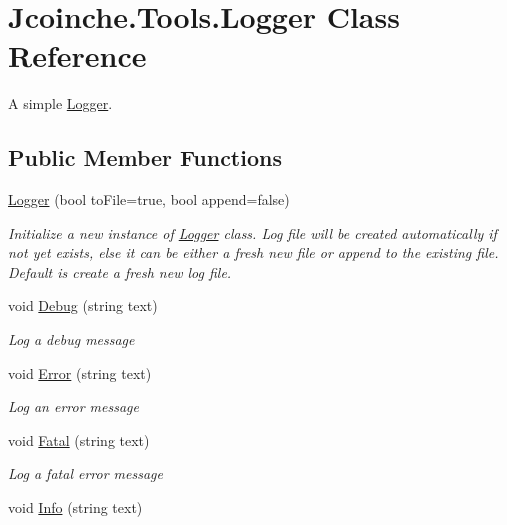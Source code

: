 \hypertarget{class_jcoinche_1_1_tools_1_1_logger}{}\section{Jcoinche.\+Tools.\+Logger Class Reference}
\label{class_jcoinche_1_1_tools_1_1_logger}


A simple \hyperlink{class_jcoinche_1_1_tools_1_1_logger}{Logger}.  


\subsection*{Public Member Functions}
\begin{DoxyCompactItemize}
\item 
\hyperlink{class_jcoinche_1_1_tools_1_1_logger_aaa424db2ffd03c2d6c3239d54b15d205}{Logger} (bool to\+File=true, bool append=false)
\begin{DoxyCompactList}\small\item\em Initialize a new instance of \hyperlink{class_jcoinche_1_1_tools_1_1_logger}{Logger} class. Log file will be created automatically if not yet exists, else it can be either a fresh new file or append to the existing file. Default is create a fresh new log file. \end{DoxyCompactList}\item 
void \hyperlink{class_jcoinche_1_1_tools_1_1_logger_a06d15c16b2cd42db50515acabb6a0e4b}{Debug} (string text)
\begin{DoxyCompactList}\small\item\em Log a debug message \end{DoxyCompactList}\item 
void \hyperlink{class_jcoinche_1_1_tools_1_1_logger_a47f7d26af52c547c95b892d59c762d2b}{Error} (string text)
\begin{DoxyCompactList}\small\item\em Log an error message \end{DoxyCompactList}\item 
void \hyperlink{class_jcoinche_1_1_tools_1_1_logger_a5b69f6795e5e0f7a43d183899495e636}{Fatal} (string text)
\begin{DoxyCompactList}\small\item\em Log a fatal error message \end{DoxyCompactList}\item 
void \hyperlink{class_jcoinche_1_1_tools_1_1_logger_a1d9d67235eeaffbbe0704121e8290379}{Info} (string text)

\end{DoxyCompactItemize}
